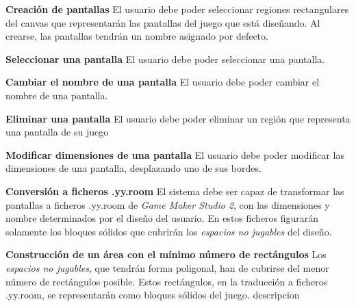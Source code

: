 	\item \textbf{Creación de pantallas}\newline
		El usuario debe poder seleccionar regiones rectangulares del canvas que representarán las pantallas del juego que está diseñando. Al crearse, las pantallas tendrán un nombre asignado por defecto.
	\item \textbf{Seleccionar una pantalla}\newline
		El usuario debe poder seleccionar una pantalla.
	\item \textbf{Cambiar el nombre de una pantalla}\newline
		El usuario debe poder cambiar el nombre de una pantalla.
	\item \textbf{Eliminar una pantalla}\newline
		El usuario debe poder eliminar un región que representa una pantalla de su juego
	\item \textbf{Modificar dimensiones de una pantalla}\newline
		El usuario debe poder modificar las dimensiones de una pantalla, desplazando uno de sus bordes.
	\item \textbf{Conversión a ficheros .yy.room}\newline
		El sistema debe ser capaz de transformar las pantallas a ficheros .yy.room de \textit{Game Maker Studio 2}, con las dimensiones y nombre determinados por el diseño del usuario. En estos ficheros figurarán solamente los bloques sólidos que cubrirán los \textit{espacios no jugables} del diseño.
		\begin{functional}
			\item \textbf{Construcción de un área con el mínimo número de rectángulos}\newline
				Los \textit{espacios no jugables}, que tendrán forma poligonal, han de cubrirse del menor número de rectángulos posible. Estos rectángulos, en la traducción a ficheros .yy.room, se representarán como bloques sólidos del juego.
			descripcion
		\end{functional}
